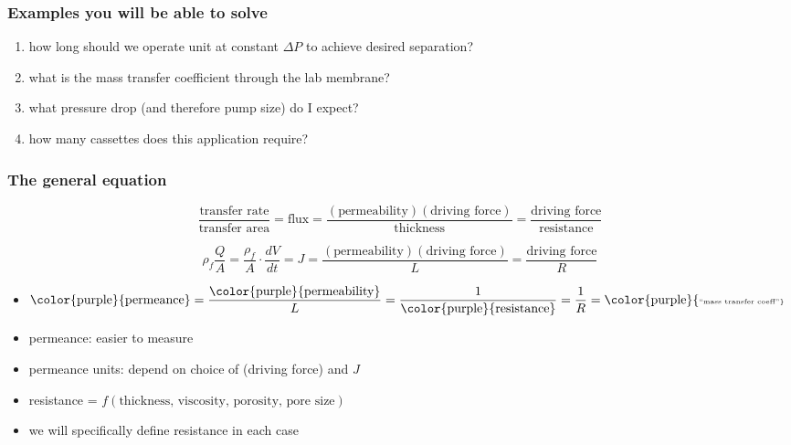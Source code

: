 \begin{frame}\frametitle{Examples you will be able to solve}
	\begin{enumerate}
		\item	how long should we operate unit at constant \( \Delta P \) to achieve desired separation?
		\item	what is the mass transfer coefficient through the lab membrane?
		\item	what pressure drop (and therefore pump size) do I expect?
		\item	how many cassettes does this application require?
	\end{enumerate}
\end{frame}

\begin{frame}\frametitle{The general equation}
	\begin{exampleblock}{}
		\[
			\displaystyle \frac{\text{transfer rate}}{\text{transfer area}}  = \text{flux} = \displaystyle \frac{(\text{permeability})(\text{driving force})}{\text{thickness}} = \displaystyle \frac{\text{driving force}}{\text{resistance}}
		\]
	\end{exampleblock}

	
	\vfill
	{\color{myOrange}{Symbolically:}}
	\[
		\displaystyle \rho_f\frac{Q}{A} = \displaystyle\frac{\rho_f}{A}\cdot\frac{dV}{dt} =  J = \displaystyle \frac{(\text{permeability})(\text{driving force})}{L} = \displaystyle \frac{\text{driving force}}{R} 
	\]
	\begin{itemize}
		\item	 $\text{\color{purple}{permeance}} = \displaystyle \frac{\text{\color{purple}{permeability}}}{L} = \displaystyle \frac{1}{\text{\color{purple}{resistance}}} = \displaystyle \frac{1}{R} = \text{{\color{purple}{\tiny ``mass transfer coeff''}}}$
		\item	permeance: easier to measure
		\item	permeance units: depend on choice of (driving force) and $J$
		\item	resistance = $f(\text{thickness, viscosity, porosity, pore size})$
		\item	we will specifically define resistance in each case				
	\end{itemize}
	
\end{frame}

